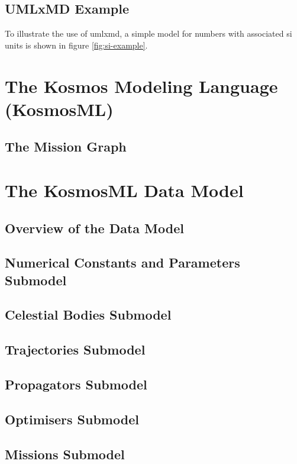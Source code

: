 \subsection{UMLxMD Example}
\label{sec:umlxmd-example}
To illustrate the use of \ac{umlxmd}, a simple model for numbers with associated \ac{si} units is shown in figure \ref{fig:si-example}.



\section{The Kosmos Modeling Language (KosmosML)}
\label{sec:kosmosml}

\subsection{The Mission Graph}
\label{sec:mission-graph}

\section{The KosmosML Data Model}
\label{sec:kosmosml-data-model}

\subsection{Overview of the Data Model}
\label{sec:overview-data-model}



\subsection{Numerical Constants and Parameters Submodel}
\label{sec:numbers-submodel}



\subsection{Celestial Bodies Submodel}
\label{sec:celestial-bodies-submodel}



\subsection{Trajectories Submodel}
\label{sec:trajectories-submodel}



\subsection{Propagators Submodel}
\label{sec:propagators-submodel}



\subsection{Optimisers Submodel}
\label{sec:optimisers-submodel}



\subsection{Missions Submodel}
\label{sec:missions-submodel}


